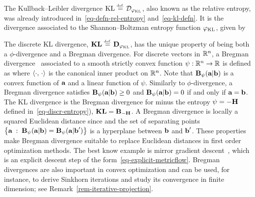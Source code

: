 \begin{example}
\label{ex_KLdiv}
The Kullback--Leibler divergence $\KL \eqdef \Divergm_{\phi_{\KL}}$, also known as the relative entropy, was already introduced in~\eqref{eq-defn-rel-entropy} and~\eqref{eq-kl-defn}. It is the divergence associated to the Shannon--Boltzman entropy function $\varphi_{\operatorname{KL}}$, given by
\end{example}

\begin{remark}\label{rem-bregman}
The discrete KL divergence, $\KLD \eqdef \DivergmD_{\phi_{\KL}}$, has the unique property of being both a $\phi$-divergence and a Bregman divergence.
%
For discrete vectors in $\mathbb{R}^n$, a Bregman divergence~\citep{bregman1967relaxation} associated to a smooth strictly convex function $\psi : \mathbb{R}^n \rightarrow \mathbb{R}$ is defined as
where $\langle \cdot,\,\cdot\rangle$ is the canonical inner product on $\mathbb{R}^n$. Note that $\mathrm{\textbf{B}}_\psi(\mathrm{\textbf{a}}|\mathrm{\textbf{b}})$ is a convex function of $\mathrm{\textbf{a}}$ and a linear function of $\psi$.
%
Similarly to $\phi$-divergence, a Bregman divergence satisfies $\mathrm{\textbf{B}}_\psi(\mathrm{\textbf{a}}|\mathrm{\textbf{b}}) \geq 0$ and $\mathrm{\textbf{B}}_\psi(\mathrm{\textbf{a}}|\mathrm{\textbf{b}})=0$ if and only if $\mathrm{\textbf{a}}=\mathrm{\textbf{b}}$. 
%
The KL divergence is the Bregman divergence for minus the entropy $\psi = -\mathrm{\textbf{H}}$ defined in~\eqref{eq-discr-entropy}), \ie $\mathrm{\textbf{KL}} = \mathrm{\textbf{B}}_{-\mathrm{\textbf{H}}}$. 
%
A Bregman divergence is locally a squared Euclidean distance since
and the set of separating points $\left\{ \mathrm{\textbf{a}} \;:\; \mathrm{\textbf{B}}_\psi(\mathrm{\textbf{a}}|\mathrm{\textbf{b}}) = \mathrm{\textbf{B}}_\psi(\mathrm{\textbf{a}}|\mathrm{\textbf{b}}') \right\}$ is a hyperplane between $\mathrm{\textbf{b}}$ and $\mathrm{\textbf{b}}'$.
%
These properties make Bregman divergence suitable to replace Euclidean distances in first order optimization methods. The best know example is mirror gradient descent~\citep{beck2003mirror}, which is an explicit descent step of the form~\eqref{eq-explicit-metricflow}.
%
Bregman divergences are also important in convex optimization and can be used, for instance, to derive Sinkhorn iterations and study its convergence in finite dimension; see Remark~\ref{rem-iterative-projection}.

\end{remark}
